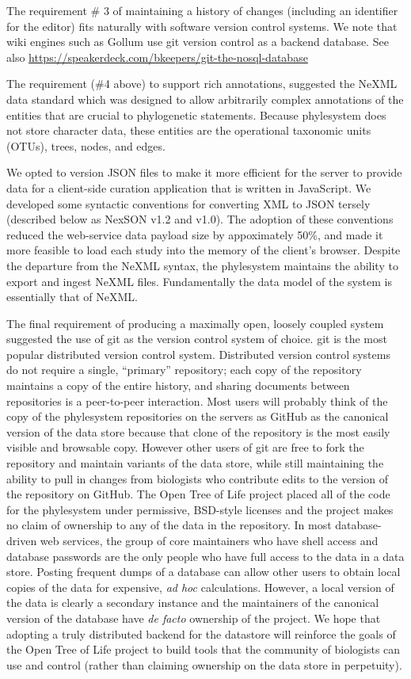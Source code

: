 \documentclass{bioinfo}
\newcommand{\ps}{phylesystem\xspace}
\newcommand{\otol}{Open Tree of Life\xspace}
\begin{document}
The requirement \# 3 of maintaining a history of changes (including an identifier for the editor) fits
naturally with software version control systems.
We note that wiki engines such as Gollum use git version control as a backend database.
See also \url{https://speakerdeck.com/bkeepers/git-the-nosql-database}

The requirement (\#4 above) to support rich annotations, suggested the NeXML data standard which was designed
    to allow arbitrarily complex annotations of the entities that are crucial to phylogenetic statements.
Because \ps does not store character data, these entities are the operational taxonomic units (OTUs), trees, nodes, and edges.

We opted to version JSON files to make it more efficient for the server to provide data for a client-side
curation application that is written in JavaScript.
We developed some syntactic conventions for converting XML to JSON tersely (described below as NexSON v1.2 and v1.0).
The adoption of these conventions reduced the web-service data payload size by appoximately 50\%, and made it more
    feasible to load each study into the memory of the client's browser.
Despite the departure from the NeXML syntax, the \ps maintains the ability to export and ingest NeXML files.
Fundamentally the data model of the system is essentially that of NeXML.

The final requirement of producing a maximally open, loosely coupled system suggested the use of git
    as the version control system of choice.
git is the most popular distributed version control system.
Distributed version control systems do not require a single, ``primary'' repository; each 
    copy of the repository maintains a copy of the entire history, and sharing documents between
    repositories is a peer-to-peer interaction.
Most users will probably think of the copy of the \ps repositories on the servers as GitHub 
    as the canonical version of the data store because that clone of the repository is the most
    easily visible and browsable copy.
However other users of git are free to fork the repository and maintain variants of the data store, while
    still maintaining the ability to pull in changes from biologists who contribute edits to the 
    version of the repository on GitHub.
The \otol project placed all of the code for the \ps under permissive, BSD-style licenses and the
    project makes no claim of ownership to any of the data in the repository.
In most database-driven web services, the group of core maintainers who have shell access and 
    database passwords are the only people who have full access to the data in a data store.
Posting frequent dumps of a database can allow other users to obtain local copies of the data 
    for expensive, {\em ad hoc} calculations.
However, a local version of the data is clearly a secondary instance and the maintainers of the 
    canonical version of the database have {\em de facto} ownership of the project.
We hope that adopting a truly distributed backend for the datastore will reinforce the goals
    of the \otol project to build tools that the community of biologists can use and control
    (rather than claiming ownership on the data store in perpetuity).
\end{document}

